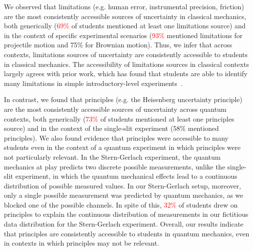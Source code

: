 \documentclass[english,aps,prstper,reprint,showpacs,longbibliography,superscriptaddress,nofootinbib]{revtex4-2}
\begin{document}
We observed that limitations (e.g. human error, instrumental precision, friction) are the most consistently accessible sources of uncertainty in classical mechanics, both generically (\textcolor{red}{69\%} of students mentioned at least one limitations source) and in the context of specific experimental scenarios (\textcolor{red}{93\%} mentioned limitations for projectile motion and 75\% for Brownian motion). %
Thus, we infer that across contexts, limitations sources of uncertainty are consistently accessible to students in classical mechanics. The accessibility of limitations sources in classical contexts largely agrees with prior work, which has found that students are able to identify many limitations in simple introductory-level experiments~\cite{Sere1993}.

In contrast, we found that principles (e.g. the Heisenberg uncertainty principle) are the most consistently accessible sources of uncertainty across quantum contexts, both generically (\textcolor{red}{73\%} of students mentioned at least one principles source) %
and in the context of the single-slit experiment (58\% mentioned principles). We also found evidence that principles were accessible to many students even in the context of a quantum experiment in which principles were not particularly relevant. In the Stern-Gerlach experiment, the quantum mechanics at play predicts two discrete possible measurements, unlike the single-slit experiment, in which the quantum mechanical effects lead to a continuous distribution of possible measured values. In our Stern-Gerlach setup, moreover, only a single possible measurement was predicted by quantum mechanics, as we blocked one of the possible channels. In spite of this, \textcolor{red}{32\%} of students drew on principles to explain the continuous distribution of measurements in our fictitious data distribution for the Stern-Gerlach experiment. Overall, our results indicate that principles are consistently accessible to students in quantum mechanics, even in contexts in which principles may not be relevant. 
\end{document}
